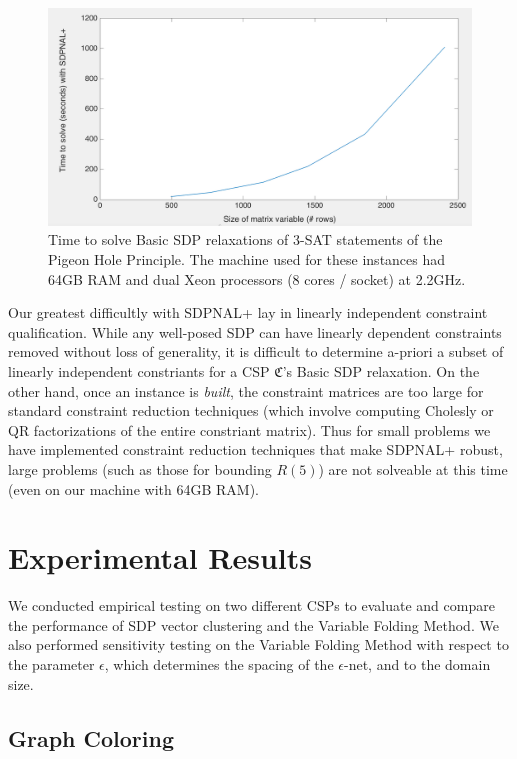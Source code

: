 \documentclass[12pt]{article} %
\begin{document}
\begin{figure}[ht!]
\includegraphics[width=\textwidth]{images/runtime}
\caption{Time to solve Basic SDP relaxations of 3-SAT statements of the Pigeon Hole Principle. The machine used for these instances had 64GB RAM and dual Xeon processors (8 cores / socket) at 2.2GHz.}
\end{figure}

Our greatest difficultly with SDPNAL+ lay in linearly independent constraint qualification. While any well-posed SDP can have linearly dependent constraints removed without loss of generality, it is difficult to determine a-priori a subset of linearly independent constriants for a CSP $\mathfrak{C}$'s Basic SDP relaxation. On the other hand, once an instance is \textit{built}, the constraint matrices are too large for standard constraint reduction techniques (which involve computing Cholesly or QR factorizations of the entire constriant matrix). Thus for small problems we have implemented constraint reduction techniques that make SDPNAL+ robust, large problems (such as those for bounding $R(5)$) are not solveable at this time (even on our machine with 64GB RAM).

\section{Experimental Results}

We conducted empirical testing on two different CSPs to evaluate and compare the performance of SDP vector clustering and the Variable Folding Method. We also performed sensitivity testing on the Variable Folding Method with respect to the parameter $\epsilon$, which determines the spacing of the $\epsilon$-net, and to the domain size.

\subsection{Graph Coloring}
\end{document}
